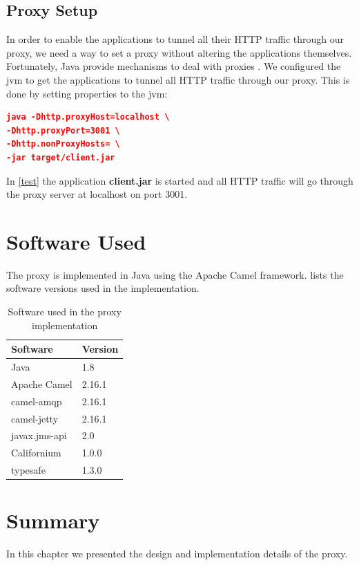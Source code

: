 


\subsection{Proxy Setup}

In order to enable the applications to tunnel all their HTTP traffic through our
proxy, we need a way to set a proxy without altering the applications
themselves. Fortunately, Java provide mechanisms to deal with proxies
\cite{oracle-proxy}. We configured the \gls{jvm} to get the applications to
tunnel all HTTP traffic through our proxy. This is done by setting properties to
the \gls{jvm}:


\begin{lstlisting}[frame=single, language=json, caption="Setting a proxy on the \gls{jvm}", label=test]
java -Dhttp.proxyHost=localhost \
-Dhttp.proxyPort=3001 \
-Dhttp.nonProxyHosts= \
-jar target/client.jar
\end{lstlisting}

In \cref{test} the application \textbf{client.jar} is started and all HTTP
traffic will go through the proxy server at localhost on port 3001.


\section{Software Used}

The proxy is implemented in Java using the Apache Camel framework.
 lists the software versions used in the
implementation.

\begin{table}[h]
\begin{tabular}{|l|l|}
    \hline
\textbf{Software} & \textbf{Version} \\ \hline
Java            & 1.8           \\ \hline
Apache Camel     & 2.16.1           \\ \hline
camel-amqp      & 2.16.1            \\ \hline
camel-jetty      & 2.16.1            \\ \hline
javax.jms-api      & 2.0            \\ \hline
Californium      & 1.0.0            \\ \hline
typesafe      & 1.3.0            \\ \hline
\end{tabular}
\caption{Software used in the proxy implementation}
\label{table:implementation-versions}
\end{table}

\section{Summary}

In this chapter we presented the design and implementation details of the proxy.
